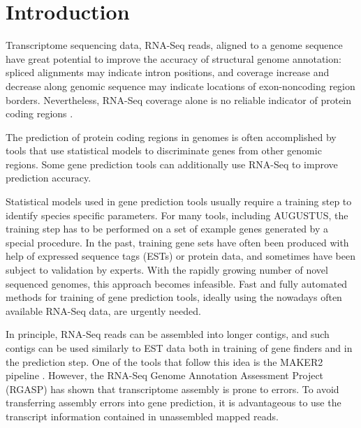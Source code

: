 \documentclass[a4paper,10pt]{article}
\begin{document}
\section{Introduction}

Transcriptome sequencing data, RNA-Seq reads, aligned to a genome sequence have great potential to improve the accuracy of structural genome annotation: spliced alignments may indicate intron positions, and coverage increase and decrease along genomic sequence may indicate locations of exon-noncoding region borders. Nevertheless, RNA-Seq coverage alone is no reliable indicator of protein coding regions \citep{InsectOpinion2015}. 

The prediction of protein coding regions in genomes is often accomplished by tools that use statistical models to discriminate genes from other genomic regions. Some gene prediction tools can additionally use RNA-Seq 
 to improve prediction accuracy.

Statistical models used in gene prediction tools usually require a training  step to identify species specific parameters. For many tools, including AUGUSTUS, the training step has to be performed on a set of example genes generated by a special procedure. In the past, training gene sets have often been produced with help of expressed sequence tags (ESTs) or protein data, and sometimes have been subject to validation by experts. With the rapidly growing number of novel sequenced genomes, this approach becomes infeasible. Fast and fully automated methods for training of gene prediction tools, ideally using the nowadays often available RNA-Seq data, are urgently needed.

In principle, RNA-Seq reads can be assembled into longer contigs, and such contigs can be used similarly to EST data both in training of gene finders and in the prediction step. One of the tools that follow this idea is the MAKER2 pipeline \citep{MAKER2}. However, the RNA-Seq Genome Annotation Assessment Project (RGASP) \citep{RGASP} has shown that transcriptome assembly is prone to errors. To avoid transferring assembly errors into gene prediction, it is advantageous to use the transcript information contained in unassembled mapped reads.
\end{document}
